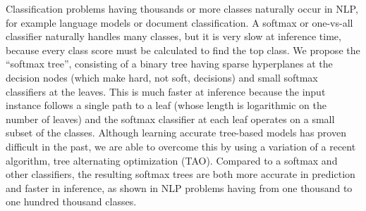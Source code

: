 Classification problems having thousands or more classes naturally occur in NLP, for example language models or document classification. A softmax or one-vs-all classifier naturally handles many classes, but it is very slow at inference time, because every class score must be calculated to find the top class. We propose the ``softmax tree'', consisting of a binary tree having sparse hyperplanes at the decision nodes (which make hard, not soft, decisions) and small softmax classifiers at the leaves. This is much faster at inference because the input instance follows a single path to a leaf (whose length is logarithmic on the number of leaves) and the softmax classifier at each leaf operates on a small subset of the classes. Although learning accurate tree-based models has proven difficult in the past, we are able to overcome this by using a variation of a recent algorithm, tree alternating optimization (TAO). Compared to a softmax and other classifiers, the resulting softmax trees are both more accurate in prediction and faster in inference, as shown in NLP problems having from one thousand to one hundred thousand classes.
